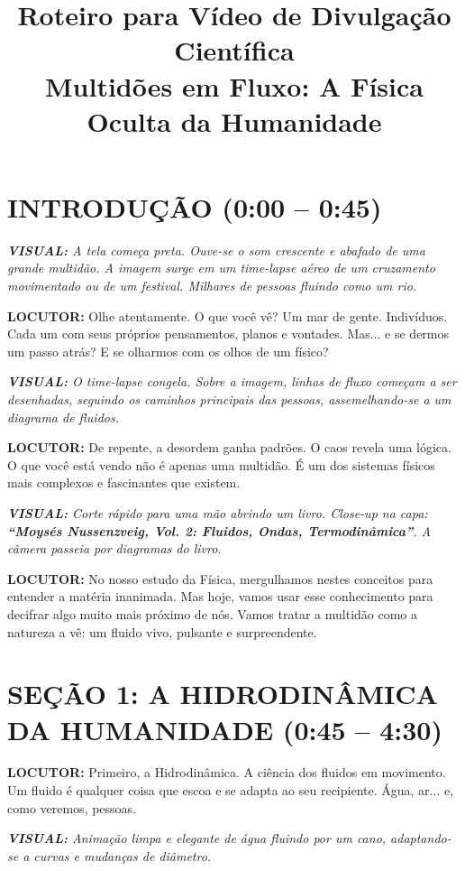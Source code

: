 \documentclass[a4paper, 10pt]{article}
\title{\sffamily Roteiro para Vídeo de Divulgação Científica \\ \large Multidões em Fluxo: A Física Oculta da Humanidade}
\newcommand{\locutor}[1]{%
	\par\noindent\textcolor{locutorgray}{\textbf{LOCUTOR:} #1}%
}
\newcommand{\visual}[1]{%
	\par\noindent\textcolor{visualblue}{\textit{\textbf{VISUAL:} #1}}%
}
\begin{document}
	
	\maketitle

	
	
	\section*{INTRODUÇÃO (0:00 -- 0:45)}
	
	\visual{A tela começa preta. Ouve-se o som crescente e abafado de uma grande multidão. A imagem surge em um time-lapse aéreo de um cruzamento movimentado ou de um festival. Milhares de pessoas fluindo como um rio.}
	
	\locutor{Olhe atentamente. O que você vê? Um mar de gente. Indivíduos. Cada um com seus próprios pensamentos, planos e vontades. Mas... e se dermos um passo atrás? E se olharmos com os olhos de um físico?}
	
	\visual{O time-lapse congela. Sobre a imagem, linhas de fluxo começam a ser desenhadas, seguindo os caminhos principais das pessoas, assemelhando-se a um diagrama de fluidos.}
	
	\locutor{De repente, a desordem ganha padrões. O caos revela uma lógica. O que você está vendo não é apenas uma multidão. É um dos sistemas físicos mais complexos e fascinantes que existem.}
	
	\visual{Corte rápido para uma mão abrindo um livro. Close-up na capa: \textbf{``Moysés Nussenzveig, Vol. 2: Fluidos, Ondas, Termodinâmica''}. A câmera passeia por diagramas do livro.}
	
	\locutor{No nosso estudo da Física, mergulhamos nestes conceitos para entender a matéria inanimada. Mas hoje, vamos usar esse conhecimento para decifrar algo muito mais próximo de nós. Vamos tratar a multidão como a natureza a vê: um fluido vivo, pulsante e surpreendente.}
	
	\section*{SEÇÃO 1: A HIDRODINÂMICA DA HUMANIDADE (0:45 -- 4:30)}
	
	\locutor{Primeiro, a Hidrodinâmica. A ciência dos fluidos em movimento. Um fluido é qualquer coisa que escoa e se adapta ao seu recipiente. Água, ar... e, como veremos, pessoas.}
	
	\visual{Animação limpa e elegante de água fluindo por um cano, adaptando-se a curvas e mudanças de diâmetro.}
	
\end{document}
